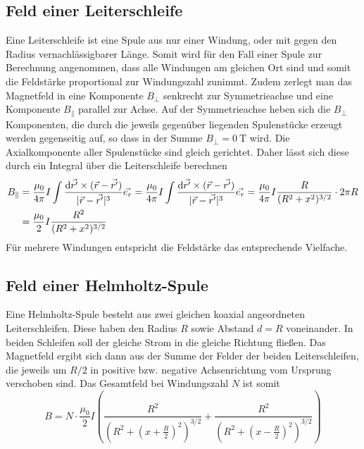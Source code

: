\subsection{Feld einer Leiterschleife}
Eine Leiterschleife ist eine Spule aus nur einer Windung, oder mit gegen den Radius vernachlässigbarer Länge. Somit wird für den Fall einer Spule zur Berechnung angenommen, dass alle Windungen am gleichen Ort sind und somit die Feldstärke proportional zur Windungszahl zunimmt. Zudem zerlegt man das Magnetfeld in eine Komponente $ B_\perp $ senkrecht zur Symmetrieachse und eine Komponente $ B_\parallel $ parallel zur Achse. Auf der Symmetrieachse heben sich die $ B_\perp $ Komponenten, die durch die jeweils gegenüber liegenden Spulenstücke erzeugt werden gegenseitig auf, so dass in der Summe $ B_\perp = \SI{0}{\tesla} $ wird. Die Axialkomponente aller Spulenstücke sind gleich gerichtet. Daher lässt sich diese durch ein Integral über die Leiterschleife berechnen
\begin{align}
 	B_\parallel &= \frac{\mu_0}{4\pi} I \int \frac{\mathrm{d}\vec{r'}\times (\vec{r} - \vec{r'})}{|\vec{r} - \vec{r'}|^3} \vec{e_r} = \frac{\mu_0}{4\pi} I \int \frac{\mathrm{d}\vec{r'}\times (\vec{r} - \vec{r'})}{|\vec{r} - \vec{r'}|^3} \vec{e_r}
 	 = \frac{\mu_0}{4\pi} I \frac{R}{(R^2 + x^2)^{3/2}} \cdot 2\pi R \notag \\
 	&= \frac{\mu_0}{2}I \frac{R^2}{(R^2 + x^2)^{3/2}}
    \label{eq:schleife}
\end{align}
Für mehrere Windungen entspricht die Feldstärke das entsprechende Vielfache.

\subsection{Feld einer Helmholtz-Spule}
Eine Helmholtz-Spule besteht aus zwei gleichen koaxial angeordneten Leiterschleifen. Diese haben den Radius $ R $ sowie Abstand $ d = R $ voneinander. In beiden Schleifen soll der gleiche Strom in die gleiche Richtung fließen. Das Magnetfeld ergibt sich dann aus der Summe der Felder der beiden Leiterschleifen, die jeweils um $ R/2 $ in positive bzw. negative Achsenrichtung vom Ursprung verschoben sind. Das Gesamtfeld bei Windungszahl $ N $ ist somit
\begin{equation}
	B = N\cdot \frac{\mu_0}{2} I \left(\frac{R^2}{\left(R^2 + \left(x + \frac{R}{2}\right)^2\right)^{3/2}} + \frac{R^2}{\left(R^2 + \left(x - \frac{R}{2}\right)^2\right)^{3/2}}\right)
    \label{eq:helmholtz}
\end{equation}

